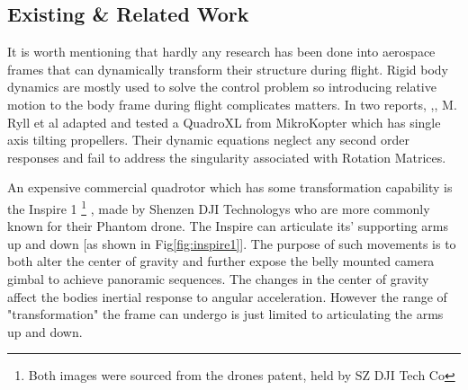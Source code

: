 \subsection{Existing \& Related Work}
\label{subsec:ch1.lit.related}
It is worth mentioning that hardly any research has been done into aerospace frames that can dynamically transform their structure during flight. Rigid body dynamics are mostly used to solve the control problem so introducing relative motion to the body frame during flight complicates matters. In two reports, \cite{tiltpropellercontrol},\cite{tiltpropellerflight}, M. Ryll et al adapted and tested a QuadroXL from MikroKopter \cite{mikrokopter} which has single axis tilting propellers. Their dynamic equations neglect any second order responses and fail to address the singularity associated with Rotation Matrices.
\par
An expensive commercial quadrotor which has some transformation capability is the Inspire 1 \cite{inspire}\footnote{Both images were sourced from the drones patent, held by SZ DJI Tech Co\cite{djinspire}}
, made by Shenzen DJI Technologys who are more commonly known for their Phantom drone. The Inspire can articulate its' supporting arms up and down [as shown in Fig\ref{fig:inspire1}]. The purpose of such movements is to both alter the center of gravity and further expose the belly mounted camera gimbal to achieve panoramic sequences. The changes in the center of gravity affect the bodies inertial response to angular acceleration. However the range of "transformation" the frame can undergo is just limited to articulating the arms up and down.
\\
